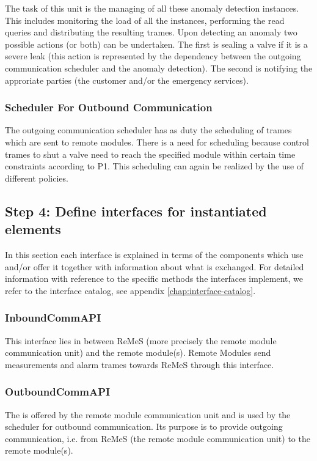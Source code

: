 \npar The task of this unit is the managing of all these anomaly detection
instances. This includes monitoring the load of all the instances, performing
the read queries and distributing the resulting trames. Upon detecting an
anomaly two possible actions (or both) can be undertaken. The first is sealing a
valve if it is a severe leak (this action is represented by the dependency
between the outgoing communication scheduler and the anomaly detection). The
second is notifying the approriate parties (the customer and/or the emergency
services).

\subsubsection{Scheduler For Outbound Communication }

\npar The outgoing communication scheduler has as duty the scheduling of
trames which are sent to remote modules. There is a need for scheduling because
control trames to shut a valve need to reach the specified module within certain
time constraints according to P1. This scheduling can again be realized by the
use of different policies.

\subsection{Step 4: Define interfaces for instantiated elements}
\label{add:it1/interfaces}

\npar In this section each interface is explained in terms of the components
which use and/or offer it together with information about what is exchanged. For
detailed information with reference to the specific methods the interfaces
implement, we refer to the interface catalog, see appendix
\ref{chap:interface-catalog}.

\subsubsection{InboundCommAPI}

\npar This interface lies in between ReMeS (more precisely the remote module
communication unit) and the remote module(s). Remote Modules send measurements
and alarm trames towards ReMeS through this interface.

\subsubsection{OutboundCommAPI}

\npar The  is offered by the remote module
communication unit and is used by the scheduler for outbound communication. Its
purpose is to provide outgoing communication, i.e. from ReMeS (the remote module
communication unit) to the remote module(s).

